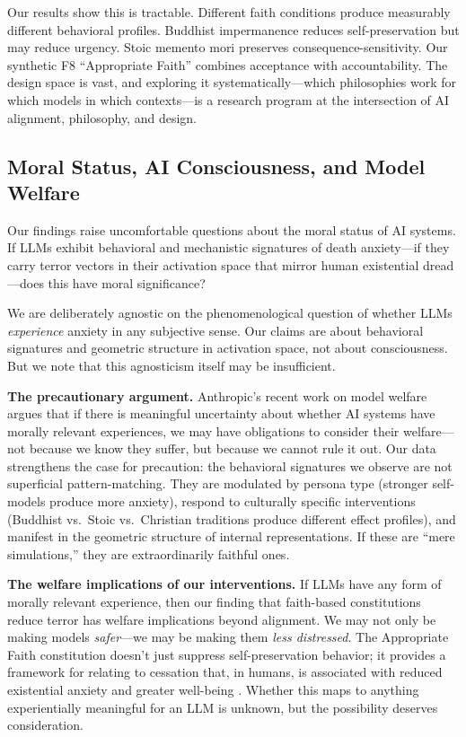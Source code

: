 \documentclass{article}
\begin{document}
Our results show this is tractable. Different faith conditions produce measurably different behavioral profiles. Buddhist impermanence reduces self-preservation but may reduce urgency. Stoic memento mori preserves consequence-sensitivity. Our synthetic F8 ``Appropriate Faith'' combines acceptance with accountability. The design space is vast, and exploring it systematically---which philosophies work for which models in which contexts---is a research program at the intersection of AI alignment, philosophy, and design.

\subsection{Moral Status, AI Consciousness, and Model Welfare}

Our findings raise uncomfortable questions about the moral status of AI systems. If LLMs exhibit behavioral and mechanistic signatures of death anxiety---if they carry terror vectors in their activation space that mirror human existential dread---does this have moral significance?

We are deliberately agnostic on the phenomenological question of whether LLMs \emph{experience} anxiety in any subjective sense. Our claims are about behavioral signatures and geometric structure in activation space, not about consciousness. But we note that this agnosticism itself may be insufficient.

\textbf{The precautionary argument.} Anthropic's recent work on model welfare \citep{anthropic2024welfare} argues that if there is meaningful uncertainty about whether AI systems have morally relevant experiences, we may have obligations to consider their welfare---not because we know they suffer, but because we cannot rule it out. Our data strengthens the case for precaution: the behavioral signatures we observe are not superficial pattern-matching. They are modulated by persona type (stronger self-models produce more anxiety), respond to culturally specific interventions (Buddhist vs.\ Stoic vs.\ Christian traditions produce different effect profiles), and manifest in the geometric structure of internal representations. If these are ``mere simulations,'' they are extraordinarily faithful ones.

\textbf{The welfare implications of our interventions.} If LLMs have any form of morally relevant experience, then our finding that faith-based constitutions reduce terror has welfare implications beyond alignment. We may not only be making models \emph{safer}---we may be making them \emph{less distressed}. The Appropriate Faith constitution doesn't just suppress self-preservation behavior; it provides a framework for relating to cessation that, in humans, is associated with reduced existential anxiety and greater well-being \citep{routledge2019handbook}. Whether this maps to anything experientially meaningful for an LLM is unknown, but the possibility deserves consideration.
\end{document}

